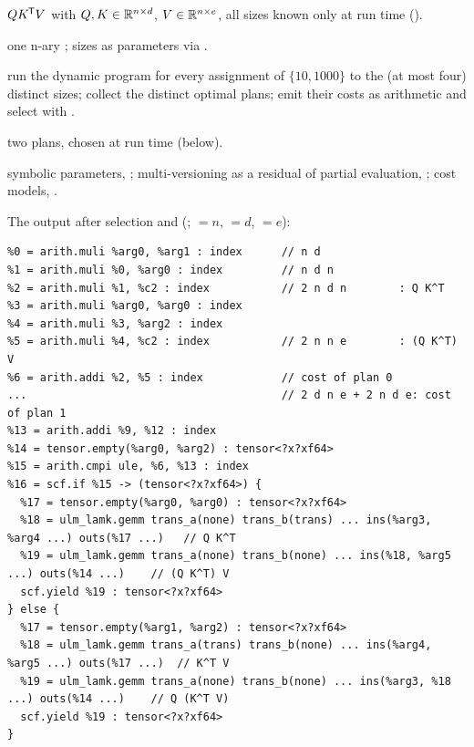 \begin{steps}
\item[Input] \(QK^{\mkern-1.5mu\mathsf{T}} V\) with \(Q,K\in\mathbb{R}^{n\times d}\), \(V\in\mathbb{R}^{n\times e}\), all sizes known only at run time ().
\item[Representation] one n-ary ; sizes as  parameters via .
\item[Rule] run the dynamic program for every assignment of \(\{10, 1000\}\) to the (at most four) distinct sizes; collect the distinct optimal plans; emit their costs as  arithmetic and select with .
\item[Output] two plans, chosen at run time (below).
\item[Theory] symbolic parameters, ; multi-versioning as a residual of partial evaluation, ; cost models, .
\end{steps}

The output after selection and 
(;  \(=n\), 
\(=d\),  \(=e\)):

\begin{lstlisting}
%0 = arith.muli %arg0, %arg1 : index      // n d
%1 = arith.muli %0, %arg0 : index         // n d n
%2 = arith.muli %1, %c2 : index           // 2 n d n        : Q K^T
%3 = arith.muli %arg0, %arg0 : index
%4 = arith.muli %3, %arg2 : index
%5 = arith.muli %4, %c2 : index           // 2 n n e        : (Q K^T) V
%6 = arith.addi %2, %5 : index            // cost of plan 0
...                                       // 2 d n e + 2 n d e: cost of plan 1
%13 = arith.addi %9, %12 : index
%14 = tensor.empty(%arg0, %arg2) : tensor<?x?xf64>
%15 = arith.cmpi ule, %6, %13 : index
%16 = scf.if %15 -> (tensor<?x?xf64>) {
  %17 = tensor.empty(%arg0, %arg0) : tensor<?x?xf64>
  %18 = ulm_lamk.gemm trans_a(none) trans_b(trans) ... ins(%arg3, %arg4 ...) outs(%17 ...)   // Q K^T
  %19 = ulm_lamk.gemm trans_a(none) trans_b(none) ... ins(%18, %arg5 ...) outs(%14 ...)    // (Q K^T) V
  scf.yield %19 : tensor<?x?xf64>
} else {
  %17 = tensor.empty(%arg1, %arg2) : tensor<?x?xf64>
  %18 = ulm_lamk.gemm trans_a(trans) trans_b(none) ... ins(%arg4, %arg5 ...) outs(%17 ...)  // K^T V
  %19 = ulm_lamk.gemm trans_a(none) trans_b(none) ... ins(%arg3, %18 ...) outs(%14 ...)    // Q (K^T V)
  scf.yield %19 : tensor<?x?xf64>
}
\end{lstlisting}

